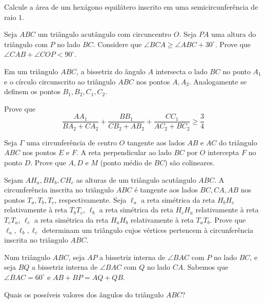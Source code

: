 \begin{questao}
  Calcule a área de um hexágono equilátero inscrito em uma
  semicircunferência de raio $1$.

\end{questao}

\begin{questao}
  Seja $ABC$ um triângulo acutângulo com circuncentro
  $O$. Seja $PA$ uma altura do triângulo com $P$ no lado
  $BC$. Considere que $\angle BCA \geq \angle ABC+30^\circ$.
  Prove que $\angle CAB + \angle COP < 90^\circ$.

\end{questao}

\begin{questao}
  Em um triângulo $ABC$, a bissetriz do ângulo $A$ intersecta o
  lado $BC$ no ponto $A_1$ e o círculo circunscrito ao triângulo
  $ABC$ nos pontos $A,A_2$. Analogamente se definem os pontos
  $B_1, B_2, C_1,C_2$.

  Prove que $$ \frac{AA_1}{BA_2+CA_2} + \frac{BB_1}{CB_2+AB_2}
  +\frac{CC_1}{AC_2+BC_2} \geq \frac{3}{4} $$
\end{questao}

\begin{questao}
  Seja $\Gamma$ uma circunferência de centro $O$
  tangente aos lados $AB$ e $AC$ do triângulo $ABC$ nos pontos
  $E$ e $F$. A reta perpendicular ao lado $BC$ por $O$
  intercepta $F$ no ponto $D$. Prove que $A,D$ e $M$ (ponto
  médio de $BC$) são colineares.

\end{questao}

\begin{questao}
  Sejam $AH_a,BH_b,CH_c$ as alturas de um triângulo
  acutângulo $ABC$.
  A circunferência inscrita no triângulo $ABC$ é
  tangente aos lados $BC,CA,AB$ nos pontos $T_a,T_b,T_c$,
  respectivamente.
  Seja $\ell_a$ a reta simétrica da reta $H_bH_c$ relativamente à
  reta $T_bT_c$, $\ell_b$ a reta simétrica da reta $H_cH_a$ relativamente à
  reta $T_cT_a$, $\ell_c$ a reta simétrica da reta $H_aH_b$ relativamente à
  reta $T_aT_b$.
  Prove que $\ell_a,\ell_b,\ell_c$ determinam um triângulo cujos
  vértices pertencem à circunferência inscrita no triângulo $ABC$.

\end{questao}

\begin{questao}
  Num triângulo $ABC$, seja $AP$ a bissetriz interna de $\angle
  BAC$ com $P$ no lado $BC$, e seja $BQ$ a bissetriz interna de
  $\angle BAC$ com $Q$ no lado $CA$.
  Sabemos que $\angle BAC = 60^\circ$ e $AB+BP = AQ+QB$.

  Quais os possíveis valores dos ângulos do triângulo $ABC$?
\end{questao}

